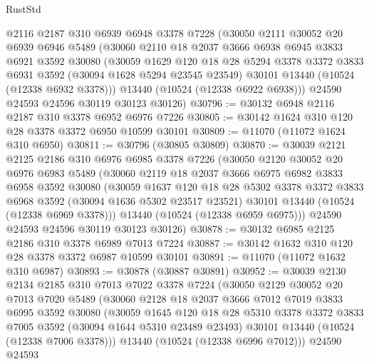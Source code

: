 \begin{lexlean}{RustStd}
\begin{coremodule}
    @2116
    @2187
    @310
    @6939
    @6948
    @3378
    @7228
    (@30050
      @2111
      @30052
      @20
      @6939
      @6946
      @5489
      (@30060
        @2110
        @18
        @2037
        @3666
        @6938
        @6945
        @3833
        @6921
        @3592
        @30080
        (@30059
          @1629
          @120
          @18
          @28
          @5294
          @3378
          @3372
          @3833
          @6931
          @3592
          (@30094 @1628 @5294 @23545 @23549)
          @30101
          @13440
          (@10524 (@12338 @6932 @3378)))
        @13440
        (@10524 (@12338 @6922 @6938)))
      @24590
      @24593
      @24596
      @30119
      @30123
      @30126)
@30796 := @30132 @6948 @2116 @2187 @310 @3378 @6952 @6976 @7226
@30805 := @30142 @1624 @310 @120 @28 @3378 @3372 @6950 @10599 @30101
@30809 := @11070 (@11072 @1624 @310 @6950)
@30811 := @30796 (@30805 @30809)
@30870 := @30039
    @2121
    @2125
    @2186
    @310
    @6976
    @6985
    @3378
    @7226
    (@30050
      @2120
      @30052
      @20
      @6976
      @6983
      @5489
      (@30060
        @2119
        @18
        @2037
        @3666
        @6975
        @6982
        @3833
        @6958
        @3592
        @30080
        (@30059
          @1637
          @120
          @18
          @28
          @5302
          @3378
          @3372
          @3833
          @6968
          @3592
          (@30094 @1636 @5302 @23517 @23521)
          @30101
          @13440
          (@10524 (@12338 @6969 @3378)))
        @13440
        (@10524 (@12338 @6959 @6975)))
      @24590
      @24593
      @24596
      @30119
      @30123
      @30126)
@30878 := @30132 @6985 @2125 @2186 @310 @3378 @6989 @7013 @7224
@30887 := @30142 @1632 @310 @120 @28 @3378 @3372 @6987 @10599 @30101
@30891 := @11070 (@11072 @1632 @310 @6987)
@30893 := @30878 (@30887 @30891)
@30952 := @30039
    @2130
    @2134
    @2185
    @310
    @7013
    @7022
    @3378
    @7224
    (@30050
      @2129
      @30052
      @20
      @7013
      @7020
      @5489
      (@30060
        @2128
        @18
        @2037
        @3666
        @7012
        @7019
        @3833
        @6995
        @3592
        @30080
        (@30059
          @1645
          @120
          @18
          @28
          @5310
          @3378
          @3372
          @3833
          @7005
          @3592
          (@30094 @1644 @5310 @23489 @23493)
          @30101
          @13440
          (@10524 (@12338 @7006 @3378)))
        @13440
        (@10524 (@12338 @6996 @7012)))
      @24590
      @24593

\end{coremodule}
\end{lexlean}
